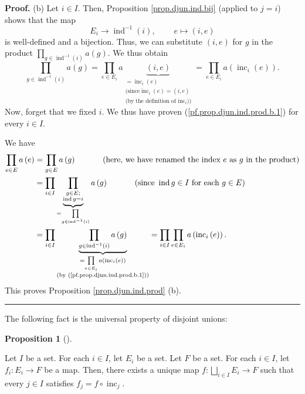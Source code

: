 \documentclass[numbers=enddot,12pt,final,onecolumn,notitlepage,abstracton]{scrartcl}
\theoremstyle{definition}
\newtheorem{prop}[theo]{Proposition}
\newenvironment{proposition}[1][]
{\begin{prop}[#1]\begin{leftbar}}
{\end{leftbar}\end{prop}}
\newenvironment{proof}[1][Proof]{\noindent\textbf{#1.} }{\ \rule{0.5em}{0.5em}}
\let\prodnonlimits\prod
\renewcommand{\prod}{\prodnonlimits\limits}
\newenvironment{verlong}{}{}
\begin{document}
\begin{verlong}
\begin{footnotesize}
\begin{proof}
(b) Let $i\in I$. Then, Proposition \ref{prop.djun.ind.bij} (applied to $j=i$)
shows that the map%
\[
E_{i}\rightarrow\operatorname*{ind}\nolimits^{-1}\left(  i\right)
,\ \ \ \ \ \ \ \ \ \ e\mapsto\left(  i,e\right)
\]
is well-defined and a bijection. Thus, we can substitute $\left(  i,e\right)
$ for $g$ in the product $\prod_{g\in\operatorname*{ind}\nolimits^{-1}\left(
i\right)  }a\left(  g\right)  $. We thus obtain%
\begin{equation}
\prod_{g\in\operatorname*{ind}\nolimits^{-1}\left(  i\right)  }a\left(
g\right)  =\prod_{e\in E_{i}}a\underbrace{\left(  i,e\right)  }%
_{\substack{=\operatorname*{inc}\nolimits_{i}\left(  e\right)  \\\text{(since
}\operatorname*{inc}\nolimits_{i}\left(  e\right)  =\left(  i,e\right)
\\\text{(by the definition of }\operatorname*{inc}\nolimits_{i}\text{))}%
}}=\prod_{e\in E_{i}}a\left(  \operatorname*{inc}\nolimits_{i}\left(
e\right)  \right)  . \label{pf.prop.djun.ind.prod.b.1}%
\end{equation}
Now, forget that we fixed $i$. We thus have proven
(\ref{pf.prop.djun.ind.prod.b.1}) for every $i\in I$.

We have%
\begin{align*}
\prod_{e\in E}a\left(  e\right)   &  =\prod_{g\in E}a\left(  g\right)
\ \ \ \ \ \ \ \ \ \ \left(  \text{here, we have renamed the index }e\text{ as
}g\text{ in the product}\right) \\
&  =\prod_{i\in I}\underbrace{\prod_{\substack{g\in E;\\\operatorname*{ind}%
g=i}}}_{=\prod_{g\in\operatorname*{ind}\nolimits^{-1}\left(  i\right)  }%
}a\left(  g\right)  \ \ \ \ \ \ \ \ \ \ \left(  \text{since }%
\operatorname*{ind}g\in I\text{ for each }g\in E\right) \\
&  =\prod_{i\in I}\underbrace{\prod_{g\in\operatorname*{ind}\nolimits^{-1}%
\left(  i\right)  }a\left(  g\right)  }_{\substack{=\prod_{e\in E_{i}}a\left(
\operatorname*{inc}\nolimits_{i}\left(  e\right)  \right)  \\\text{(by
(\ref{pf.prop.djun.ind.prod.b.1}))}}}=\prod_{i\in I}\prod_{e\in E_{i}}a\left(
\operatorname*{inc}\nolimits_{i}\left(  e\right)  \right)  .
\end{align*}
This proves Proposition \ref{prop.djun.ind.prod} (b).
\end{proof}

The following fact is the universal property of disjoint unions:

\begin{proposition}
\label{prop.djun.uniprop}Let $I$ be a set. For each $i\in I$, let $E_{i}$ be a
set. Let $F$ be a set. For each $i\in I$, let $f_{i}:E_{i}\rightarrow F$ be a
map. Then, there exists a unique map $f:\bigsqcup_{i\in I}E_{i}\rightarrow F$
such that every $j\in I$ satisfies $f_{j}=f\circ\operatorname*{inc}%
\nolimits_{j}$.
\end{proposition}


\end{footnotesize}
\end{verlong}
\end{document}
